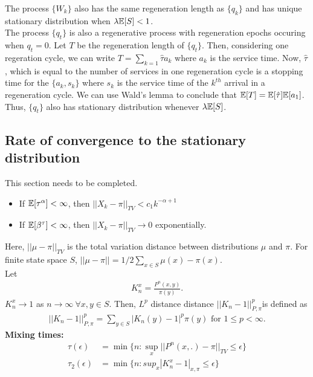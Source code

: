 \documentclass[all-lectures.tex]{subfiles}
\begin{document}
\indent The process $\{W_k\}$ also has the same regeneration length as $\{q_k\}$ and has unique stationary distribution when $\lambda\mathbb{E}[S] < 1$.\\
\indent The process $\{q_t\}$ is also a regenerative process with regeneration epochs occuring when $q_t = 0$. Let $T$ be the regeneration length of $\{q_t\}$. Then, considering one regeration cycle, we can write $T = \sum_{k = 1}{\hat{\tau}} a_k$ where $a_k$ is the service time. Now, $\hat{\tau}$, which is equal to the number of services in one regeneration cycle is a stopping time for the $\{a_k,s_k\}$ where $s_k$ is the service time of the $k^{th}$ arrival in a regeneration cycle. We can use Wald's lemma to conclude that $\mathbb{E}[T] = \mathbb{E}[\hat{\tau}] \mathbb{E}[a_1]$. Thus, $\{q_t\}$ also has stationary distribution whenever $\lambda\mathbb{E}[S]$.
\subsection*{Rate of convergence to the stationary distribution}
{\color{red} This section needs to be completed. }
\begin{itemize}
\item If $\mathbb{E}[\tau^\alpha] < \infty$, then $|| X_k - \pi ||_{TV} < c_1 k^{-\alpha +1}$
\item If $\mathbb{E}[\beta^{\tau}] < \infty$, then $|| X_k - \pi||_{TV} \rightarrow 0 $ exponentially.
\end{itemize}
Here, $||\mu - \pi||_{TV}$ is the total variation distance between distributions $\mu$ and $\pi$. For finite state space $S$, $||\mu - \pi|| = 1/2 \sum_{x\in S} \mu(x) - \pi(x)$. \\
Let 
\begin{align*}
K_n^{x} = \frac{P^n(x,y)}{\pi(y)}.
\end{align*}
$K_n^{x} \rightarrow 1$ as $n \rightarrow \infty \ \forall x,y \in S$. Then, $L^p$ distance distance $||K_n-1||^p_{P,\pi}$is defined as 
\begin{align*}
||K_n-1||^p_{P,\pi} = \sum_{y\in S} |K_n(y)-1|^p \pi(y) \text{ for } 1 \leq p < \infty.
\end{align*}
\textbf{Mixing times:}
\begin{align*}
\tau(\epsilon) &= \min\{n: \sup_x ||P^n(x,.)-\pi||_{TV} \leq \epsilon\} \\
\tau_2(\epsilon) &= \min\{n: sup_x |K_n^x - 1|_{x,\pi} \leq \epsilon\}
\end{align*}
\end{document}
